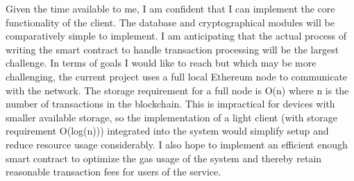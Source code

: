\documentclass[titlepage]{report}
\begin{document}
Given the time available to me, I am confident that I can implement the core functionality of the client. The database and cryptographical modules will be comparatively simple to implement. I am anticipating that the actual process of writing the smart contract to handle transaction processing will be the largest challenge. In terms of goals I would like to reach but which may be more challenging, the current project uses a full local Ethereum node to communicate with the network. The storage requirement for a full node is O(n) where n is the number of transactions in the blockchain. This is impractical for devices with smaller available storage, so the implementation of a \gls{light client} (with storage requirement O(log(n))) integrated into the system would simplify setup and reduce resource usage considerably. I also hope to implement an efficient enough smart contract to optimize the gas usage of the system and thereby retain reasonable transaction fees for users of the service.

\listoffigures
\printindex
\printglossaries{}
\printbibliography{}
\end{document}
